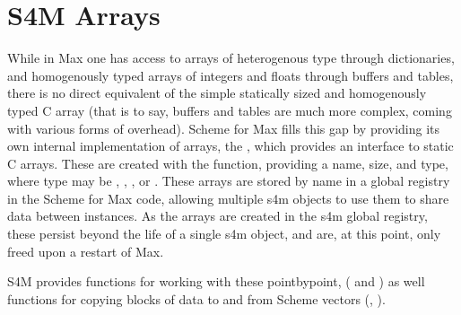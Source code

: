 \documentclass[letterpaper,10pt,english]{sphinxmanual}
\begin{document}
\begin{sphinxVerbatim}[commandchars=\\\{\}]

\end{sphinxVerbatim}


\section{S4M Arrays}
\label{\detokenize{features_usage:s4m-arrays}}
\sphinxAtStartPar
While in Max one has access to arrays of heterogenous type through dictionaries,
and homogenously typed arrays of integers and floats through buffers and tables, there is
no direct equivalent of the simple statically sized and homogenously typed C array
(that is to say, buffers and tables are much more complex, coming with various forms of overhead).
Scheme for Max fills this gap by providing its own internal implementation of arrays,
the , which provides an interface to static C arrays.
These are created with the  function, providing a name,
size, and type, where type may be , , , or .
These arrays are stored by name in a global registry in the Scheme for Max
code, allowing multiple s4m objects to use them to share data between instances.
As the arrays are created in the s4m global registry, these persist beyond
the life of a single s4m object, and are, at this point, only freed upon a restart of Max.

\sphinxAtStartPar
S4M provides functions for working with these point\sphinxhyphen{}by\sphinxhyphen{}point,
( and ) as well functions for copying
blocks of data to and from Scheme vectors (, ).
\end{document}
